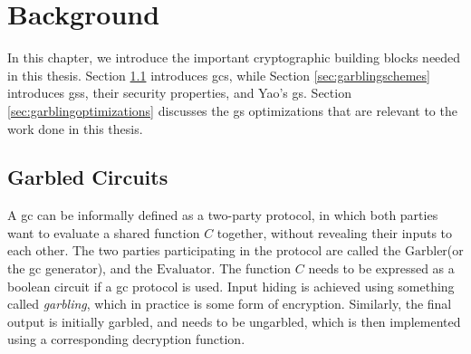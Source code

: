 \chapter{Background}
\label{chp:background} 
\newcommand{\cgarbler}{$\mathrm{Garbler}$\xspace}
\newcommand{\cevaluator}{$\mathrm{Evaluator}$\xspace}
In this chapter, we introduce the important cryptographic building blocks needed in this thesis. Section \ref{sec:garbledcircuit} introduces \acrlong{gc}s, while Section \ref{sec:garblingschemes} introduces \acrlong{gs}s, their security properties, and Yao's \acrshort{gs}. Section \ref{sec:garblingoptimizations} discusses the \acrshort{gs} optimizations that are relevant to the work done in this thesis.
\section{Garbled Circuits}
\label{sec:garbledcircuit}
A \acrlong{gc} can be informally defined as a two-party protocol, in which both parties want to evaluate a shared function $C$ together, without revealing their inputs to each other. The two parties participating in the protocol are called the \cgarbler (or the \acrlong{gc} generator), and the \cevaluator. The function $C$ needs to be expressed as a boolean circuit if a \acrlong{gc} protocol is used. Input hiding is achieved using something called \textit{garbling}, which in practice is some form of encryption. Similarly, the final output is initially garbled, and needs to be ungarbled, which is then implemented using a corresponding decryption function. 



